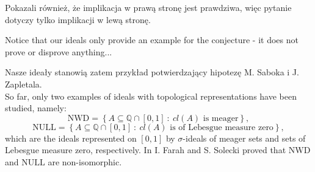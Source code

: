 \documentclass{amsart}
\newtheorem{thm}{Theorem}
\newtheorem{cor}{Corollary}
\theoremstyle{definition}
\theoremstyle{definition}
\newtheorem{conj}{Conjecture}
\newcommand{\I}{\mathcal I}
\begin{document}
Pokazali również, że implikacja w prawą stronę jest prawdziwa, więc pytanie dotyczy tylko implikacji w lewą stronę.


\color{purple}
Notice that our ideals only provide an example for the conjecture - it does not prove or disprove anything... 
\color{black}

Nasze ideały stanowią zatem przykład potwierdzający hipotezę M. Saboka i J. Zapletala.\\









So far, only two examples of ideals with topological representations have been studied, namely:
$$\textrm{NWD}=\left\{A\subseteq\mathbb{Q}\cap [0,1]\ :\ cl(A) \textrm{ is meager}\right\},$$
$$\textrm{NULL}=\left\{A\subseteq\mathbb{Q}\cap [0,1]\ :\ cl(A) \textrm{ is of Lebesgue measure zero}\right\},$$
which are the ideals represented on $[0,1]$ by $\sigma$-ideals of meager sets and sets of Lebesgue measure zero, respectively. In \cite{FS} I. Farah and S. Solecki proved that $\textrm{NWD}$ and $\textrm{NULL}$ are non-isomorphic.
\end{document}
